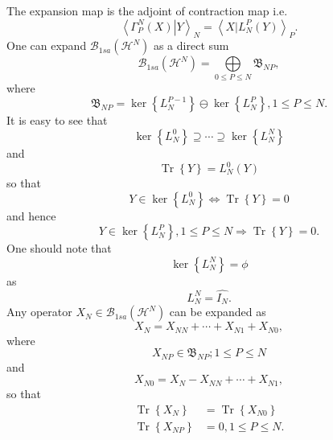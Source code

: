 \documentclass[aps,preprint]{revtex4}%
\begin{document}
The expansion map is the adjoint of contraction map i.e.
\begin{equation}
\left\langle \left.  \Gamma_{P}^{N}\left(  X\right)  \right\vert
Y\right\rangle _{N}=\left\langle \left.  X\right\vert L_{N}^{P}\left(
Y\right)  \right\rangle _{P}.
\end{equation}
One can expand $\mathcal{B}_{1sa}\left(  \mathcal{H}^{N}\right)  $ as a direct
sum
\begin{equation}
\mathcal{B}_{1sa}\left(  \mathcal{H}^{N}\right)  =%
{\displaystyle\bigoplus\limits_{0\leq P\leq N}}
\mathfrak{B}_{NP},
\end{equation}
where
\begin{equation}
\mathfrak{B}_{NP}=\ker\left\{  L_{N}^{P-1}\right\}  \ominus\ker\left\{
L_{N}^{P}\right\}  ,1\leq P\leq N.
\end{equation}
It is easy to see that%
\begin{equation}
\ker\left\{  L_{N}^{0}\right\}  \supseteq\cdots\supseteq\ker\left\{  L_{N}%
^{N}\right\}
\end{equation}
and%
\begin{equation}
\operatorname*{Tr}\left\{  Y\right\}  =L_{N}^{0}\left(  Y\right)
\end{equation}
so that
\begin{equation}
Y\in\ker\left\{  L_{N}^{0}\right\}  \Leftrightarrow\operatorname*{Tr}\left\{
Y\right\}  =0
\end{equation}
and hence
\begin{equation}
Y\in\ker\left\{  L_{N}^{P}\right\}  ,1\leq P\leq N\Rightarrow
\operatorname*{Tr}\left\{  Y\right\}  =0.
\end{equation}
One should note that
\begin{equation}
\ker\left\{  L_{N}^{N}\right\}  =\phi
\end{equation}
as
\begin{equation}
L_{N}^{N}=\widehat{I_{N}}.
\end{equation}
Any operator $X_{N}\in\mathcal{B}_{1sa}\left(  \mathcal{H}^{N}\right)  $ can
be expanded as
\begin{equation}
X_{N}=X_{NN}+\cdots+X_{N1}+X_{N0},
\end{equation}
where
\begin{equation}
X_{NP}\in\mathfrak{B}_{NP};1\leq P\leq N
\end{equation}
and
\begin{equation}
X_{N0}=X_{N}-X_{NN}+\cdots+X_{N1},
\end{equation}
so that
\begin{align}
\operatorname*{Tr}\left\{  X_{N}\right\}   &  =\operatorname*{Tr}\left\{
X_{N0}\right\} \nonumber\\
\operatorname*{Tr}\left\{  X_{NP}\right\}   &  =0,1\leq P\leq N.
\end{align}
\end{document}
